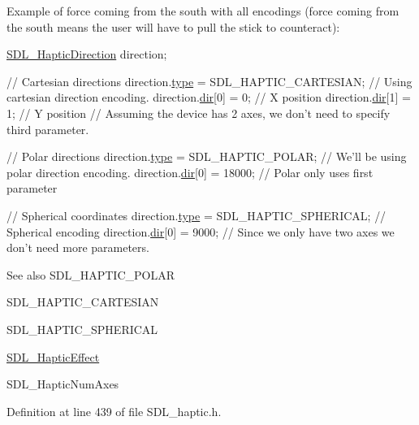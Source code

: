 Example of force coming from the south with all encodings (force coming from the south means the user will have to pull the stick to counteract)\+: 
\begin{DoxyCode}
\hyperlink{structSDL__HapticDirection}{SDL\_HapticDirection} direction;

\textcolor{comment}{// Cartesian directions}
direction.\hyperlink{structSDL__HapticDirection_acd6830ad68c4ba2af16057fa418087cc}{type} = SDL\_HAPTIC\_CARTESIAN; \textcolor{comment}{// Using cartesian direction encoding.}
direction.\hyperlink{structSDL__HapticDirection_a6b1083eefcfe8db7d9bbfd660e0373a9}{dir}[0] = 0; \textcolor{comment}{// X position}
direction.\hyperlink{structSDL__HapticDirection_a6b1083eefcfe8db7d9bbfd660e0373a9}{dir}[1] = 1; \textcolor{comment}{// Y position}
\textcolor{comment}{// Assuming the device has 2 axes, we don't need to specify third parameter.}

\textcolor{comment}{// Polar directions}
direction.\hyperlink{structSDL__HapticDirection_acd6830ad68c4ba2af16057fa418087cc}{type} = SDL\_HAPTIC\_POLAR; \textcolor{comment}{// We'll be using polar direction encoding.}
direction.\hyperlink{structSDL__HapticDirection_a6b1083eefcfe8db7d9bbfd660e0373a9}{dir}[0] = 18000; \textcolor{comment}{// Polar only uses first parameter}

\textcolor{comment}{// Spherical coordinates}
direction.\hyperlink{structSDL__HapticDirection_acd6830ad68c4ba2af16057fa418087cc}{type} = SDL\_HAPTIC\_SPHERICAL; \textcolor{comment}{// Spherical encoding}
direction.\hyperlink{structSDL__HapticDirection_a6b1083eefcfe8db7d9bbfd660e0373a9}{dir}[0] = 9000; \textcolor{comment}{// Since we only have two axes we don't need more parameters.}
\end{DoxyCode}


\begin{DoxySeeAlso}{See also}
S\+D\+L\+\_\+\+H\+A\+P\+T\+I\+C\+\_\+\+P\+O\+L\+A\+R 

S\+D\+L\+\_\+\+H\+A\+P\+T\+I\+C\+\_\+\+C\+A\+R\+T\+E\+S\+I\+A\+N 

S\+D\+L\+\_\+\+H\+A\+P\+T\+I\+C\+\_\+\+S\+P\+H\+E\+R\+I\+C\+A\+L 

\hyperlink{unionSDL__HapticEffect}{S\+D\+L\+\_\+\+Haptic\+Effect} 

S\+D\+L\+\_\+\+Haptic\+Num\+Axes 
\end{DoxySeeAlso}


Definition at line 439 of file S\+D\+L\+\_\+haptic.\+h.



